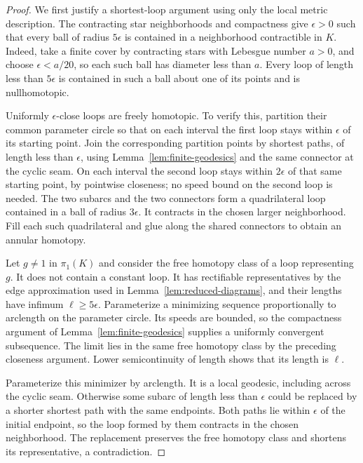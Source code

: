 \begin{proof}
We first justify a shortest-loop argument using only the local metric
description. The contracting star neighborhoods and compactness give
$\epsilon>0$ such that every ball of radius $5\epsilon$ is contained in
a neighborhood contractible in $K$. Indeed, take a finite cover by
contracting stars with Lebesgue number $a>0$, and choose
$\epsilon<a/20$, so each such ball has diameter less than $a$.
Every loop of length less than $5\epsilon$ is contained in such a ball
about one of its points and is nullhomotopic.

Uniformly $\epsilon$-close loops are freely homotopic. To verify this,
partition their common parameter circle so that on each interval the
first loop stays within $\epsilon$ of its starting point. Join the
corresponding partition points by shortest paths, of length less than
$\epsilon$, using Lemma~\ref{lem:finite-geodesics} and the same connector
at the cyclic seam. On each interval the
second loop stays within $2\epsilon$ of that same starting point, by
pointwise closeness; no speed bound on the second loop is needed. The
two subarcs and the two connectors form a quadrilateral loop contained
in a ball of radius $3\epsilon$. It contracts in the chosen larger
neighborhood. Fill each such quadrilateral and glue along the shared
connectors to obtain an annular homotopy.

Let $g\ne1$ in $\pi_1(K)$ and consider the free homotopy class of a loop
representing $g$. It does not contain a constant loop. It has rectifiable
representatives by the edge approximation used in
Lemma~\ref{lem:reduced-diagrams}, and their lengths have infimum
$\ell\ge5\epsilon$. Parameterize a minimizing sequence proportionally
to arclength on the parameter circle. Its speeds are bounded, so the
compactness argument of Lemma~\ref{lem:finite-geodesics} supplies a
uniformly convergent subsequence. The limit lies in the same free
homotopy class by the preceding closeness argument. Lower
semicontinuity of length shows that its length is $\ell$.

Parameterize this minimizer by arclength. It is a local geodesic,
including across the cyclic seam. Otherwise some subarc of length
less than $\epsilon$ could be replaced by a shorter shortest path
with the same endpoints. Both paths lie within $\epsilon$ of the
initial endpoint, so the loop formed by them contracts in the chosen
neighborhood. The replacement preserves the free homotopy class and
shortens its representative, a contradiction.


\end{proof}
